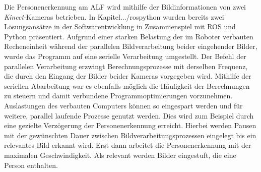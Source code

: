 	Die Personenerkennung am ALF wird mithilfe der Bildinformationen von zwei \textit{Kinect}-Kameras betrieben. In Kapitel.../rospython wurden bereits zwei Lösungsansätze in der Softwarentwicklung in Zusammenspiel mit ROS und Python präsentiert. Aufgrund einer starken Belastung der im Roboter verbauten Recheneinheit während der parallelen Bildverarbeitung beider eingehender Bilder, wurde das Programm auf eine serielle Verarbeitung umgestellt. Der Befehl der parallelen Verarbeitung erzwingt Berechnungsprozesse mit derselben Frequenz, die durch den Eingang der Bilder beider Kameras vorgegeben wird. Mithilfe der seriellen Abarbeitung  war es ebenfalls möglich die Häufigkeit der Berechnungen zu steuern und damit verbundene Programmoptimierungen vorzunehmen. Auslastungen des verbauten Computers können so eingespart werden und für weitere, parallel laufende Prozesse genutzt werden. Dies wird zum Beispiel durch eine gezielte Verzögerung der Personenerkennung erreicht. Hierbei werden Pausen mit der gewünschten Dauer zwischen Bildverarbeitungsprozessen eingelegt bis ein relevantes Bild erkannt wird. Erst dann arbeitet die Personenerkennung mit der maximalen Geschwindigkeit. Als relevant werden Bilder eingestuft, die eine Person enthalten.  
	\newpage
